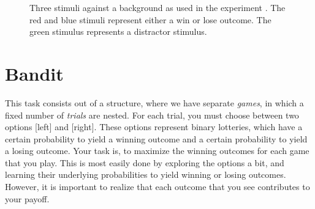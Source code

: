 \documentclass[12pt, oneside]{scrartcl}
\begin{document}
\pagebreak


\begin{figure}[h!]
\begin{center}

\captionsetup{width=.9\linewidth, format=plain}
\caption[Experimental Stimuli]{Three stimuli against a background as used in the experiment . The red and blue stimuli represent either a win or lose outcome. The green stimulus represents a distractor stimulus.}
\label{fig:stimuli}
\end{center}
\end{figure}





\pagebreak
\section{Bandit}

This task consists out of a structure, where we have separate \textit{games}, in which a fixed number of \textit{trials} are nested. For each trial, you must choose between two options [left] and [right]. These options represent binary lotteries, which have a certain probability to yield a winning outcome and a certain probability to yield a losing outcome. Your task is, to maximize the winning outcomes for each game that you play. This is most easily done by exploring the options a bit, and learning their underlying probabilities to yield winning or losing outcomes. However, it is important to realize that each outcome that you see contributes to your payoff.  \\
\end{document}
